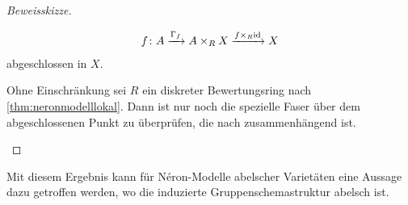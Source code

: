 \begin{Satz}
\begin{proof}[Beweisskizze]
\begin{description}[font=\normalfont\itshape]
\begin{gather*}
        f\colon A\xrightarrow{\Gamma_f} A\times_R X
        \xrightarrow{f\times_R\mathrm{id}} X
      \end{gather*}
      abgeschlossen in $X$.
    \item[$A$ hat zusammenhängende Fasern:]
      Ohne Einschränkung sei $R$ ein diskreter Bewertungsring nach
      \ref{thm:neronmodelllokal}.
      Dann ist nur noch die spezielle Faser über dem abgeschlossenen
      Punkt zu überprüfen, die nach \cite[{}5.5.1]{EGAIII-1} zusammenhängend
      ist.
      \qedhere
    \end{description}
  \end{proof}
\end{Satz}

Mit diesem Ergebnis kann für Néron-Modelle abelscher Varietäten
eine Aussage dazu getroffen werden, wo die induzierte
Gruppenschemastruktur abelsch ist.
